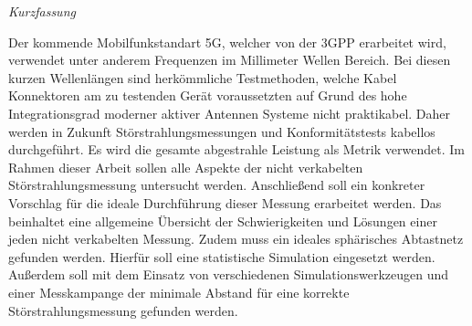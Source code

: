 

\newpage
\thispagestyle{empty}
\begin{center}
\Huge\emph{Kurzfassung}
\end{center}
\medskip
\noindent

Der kommende Mobilfunkstandart 5G, welcher von der 3GPP erarbeitet wird, verwendet unter anderem Frequenzen im Millimeter Wellen Bereich. Bei diesen kurzen Wellenlängen sind herkömmliche Testmethoden, welche Kabel Konnektoren am zu testenden Gerät voraussetzten auf Grund des hohe Integrationsgrad moderner aktiver Antennen Systeme nicht praktikabel. Daher werden in Zukunft Störstrahlungsmessungen und Konformitätstests kabellos durchgeführt. Es wird die gesamte abgestrahle Leistung als Metrik verwendet. Im Rahmen dieser Arbeit sollen alle Aspekte der nicht verkabelten Störstrahlungsmessung untersucht werden. Anschließend soll ein konkreter Vorschlag für die ideale Durchführung dieser Messung erarbeitet werden. Das beinhaltet eine allgemeine Übersicht der Schwierigkeiten und Lösungen einer jeden nicht verkabelten Messung. Zudem muss ein ideales sphärisches Abtastnetz gefunden werden. Hierfür soll eine statistische Simulation eingesetzt werden. Außerdem soll mit dem Einsatz von verschiedenen Simulationswerkzeugen und einer Messkampange der minimale Abstand für eine korrekte Störstrahlungsmessung gefunden werden.
